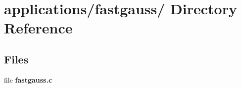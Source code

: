 \hypertarget{dir_000015}{
\section{applications/fastgauss/ Directory Reference}
\label{dir_000015}
}
\subsection*{Files}
\begin{CompactItemize}
\item 
file {\bf fastgauss.c}
\end{CompactItemize}
